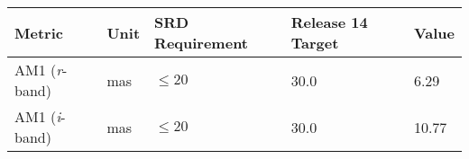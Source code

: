 \documentclass[DM,toc]{lsstdoc}
\begin{document}
\begin{longtable}[]{@{}lllll@{}}
\toprule
\begin{minipage}[b]{0.19\columnwidth}\raggedright\strut
Metric\strut
\end{minipage} & \begin{minipage}[b]{0.08\columnwidth}\raggedright\strut
Unit\strut
\end{minipage} & \begin{minipage}[b]{0.20\columnwidth}\raggedright\strut
SRD Requirement\strut
\end{minipage} & \begin{minipage}[b]{0.22\columnwidth}\raggedright\strut
Release 14 Target\strut
\end{minipage} & \begin{minipage}[b]{0.17\columnwidth}\raggedright\strut
Value\strut
\end{minipage}\tabularnewline
\midrule
\endhead
\begin{minipage}[t]{0.19\columnwidth}\raggedright\strut
AM1 (\emph{r}-band)\strut
\end{minipage} & \begin{minipage}[t]{0.08\columnwidth}\raggedright\strut
mas\strut
\end{minipage} & \begin{minipage}[t]{0.20\columnwidth}\raggedright\strut
\(\leq 20\)\strut
\end{minipage} & \begin{minipage}[t]{0.22\columnwidth}\raggedright\strut
30.0\strut
\end{minipage} & \begin{minipage}[t]{0.17\columnwidth}\raggedright\strut
6.29\strut
\end{minipage}\tabularnewline
\begin{minipage}[t]{0.19\columnwidth}\raggedright\strut
AM1 (\emph{i}-band)\strut
\end{minipage} & \begin{minipage}[t]{0.08\columnwidth}\raggedright\strut
mas\strut
\end{minipage} & \begin{minipage}[t]{0.20\columnwidth}\raggedright\strut
\(\leq 20\)\strut
\end{minipage} & \begin{minipage}[t]{0.22\columnwidth}\raggedright\strut
30.0\strut
\end{minipage} & \begin{minipage}[t]{0.17\columnwidth}\raggedright\strut
10.77\strut
\end{minipage}\tabularnewline

\end{longtable}
\end{document}
